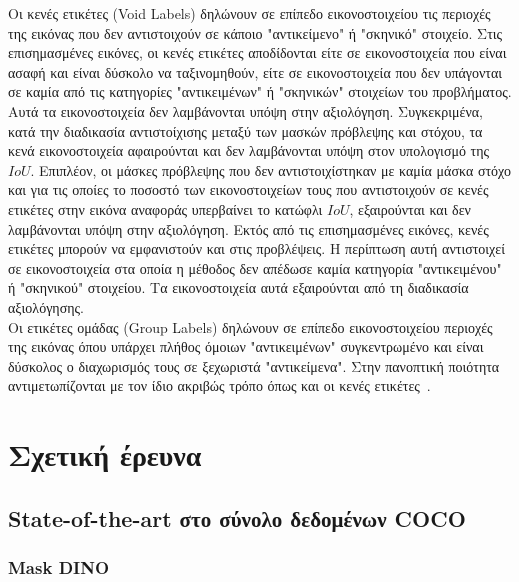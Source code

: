 \documentclass[12pt]{article}
\numberwithin{equation}{section}
\begin{document}
Οι κενές ετικέτες (Void Labels) δηλώνουν σε επίπεδο εικονοστοιχείου τις περιοχές της εικόνας που δεν αντιστοιχούν σε κάποιο "αντικείμενο" ή "σκηνικό" στοιχείο. Στις επισημασμένες εικόνες, οι κενές ετικέτες αποδίδονται είτε σε εικονοστοιχεία που είναι ασαφή και είναι δύσκολο να ταξινομηθούν, είτε σε εικονοστοιχεία που δεν υπάγονται σε καμία από τις κατηγορίες "αντικειμένων" ή "σκηνικών" στοιχείων του προβλήματος. Αυτά τα εικονοστοιχεία δεν λαμβάνονται υπόψη στην αξιολόγηση. Συγκεκριμένα, κατά την διαδικασία αντιστοίχισης μεταξύ των μασκών πρόβλεψης και στόχου, τα κενά εικονοστοιχεία αφαιρούνται και δεν λαμβάνονται υπόψη στον υπολογισμό της \(IoU\). Επιπλέον, οι μάσκες πρόβλεψης που δεν αντιστοιχίστηκαν με καμία μάσκα στόχο και για τις οποίες το ποσοστό των εικονοστοιχείων τους που αντιστοιχούν σε κενές ετικέτες στην εικόνα αναφοράς υπερβαίνει το κατώφλι \(IoU\), εξαιρούνται και δεν λαμβάνονται υπόψη στην αξιολόγηση. Εκτός από τις επισημασμένες εικόνες, κενές ετικέτες μπορούν να εμφανιστούν και στις προβλέψεις. Η περίπτωση αυτή αντιστοιχεί σε εικονοστοιχεία στα οποία η μέθοδος δεν απέδωσε καμία κατηγορία "αντικειμένου" ή "σκηνικού" στοιχείου. Τα εικονοστοιχεία αυτά εξαιρούνται από τη διαδικασία αξιολόγησης.\\

Οι ετικέτες ομάδας (Group Labels) δηλώνουν σε επίπεδο εικονοστοιχείου περιοχές της εικόνας όπου υπάρχει πλήθος όμοιων "αντικειμένων" συγκεντρωμένο και είναι δύσκολος ο διαχωρισμός τους σε ξεχωριστά "αντικείμενα". Στην πανοπτική ποιότητα αντιμετωπίζονται με τον ίδιο ακριβώς τρόπο όπως και οι κενές ετικέτες~\cite{Kirillov_2019_CVPR}.

\newpage
\mbox{}
\newpage

\section{Σχετική έρευνα}

\subsection{State-of-the-art στο σύνολο δεδομένων COCO}

\subsubsection{Mask DINO}
\end{document}
